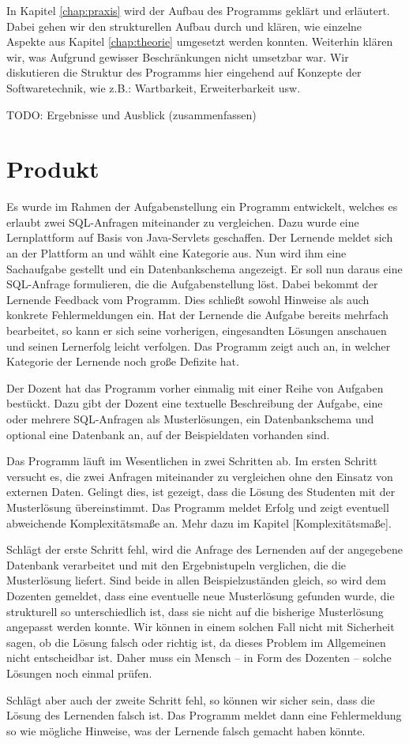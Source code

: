 In Kapitel \ref{chap:praxis} wird der Aufbau des Programms geklärt und erläutert. Dabei gehen wir den strukturellen Aufbau durch und klären, wie einzelne Aspekte aus Kapitel \ref{chap:theorie} umgesetzt werden konnten. Weiterhin klären wir, was Aufgrund gewisser Beschränkungen nicht umsetzbar war. Wir diskutieren die Struktur des Programms hier eingehend auf Konzepte der Softwaretechnik, wie z.B.: Wartbarkeit, Erweiterbarkeit usw.

TODO: Ergebnisse und Ausblick (zusammenfassen)


\section{Produkt}

Es wurde im Rahmen der Aufgabenstellung ein Programm entwickelt, welches es erlaubt zwei SQL-Anfragen miteinander zu vergleichen. Dazu wurde eine Lernplattform auf Basis von Java-Servlets geschaffen. Der Lernende meldet sich an der Plattform an und wählt eine Kategorie aus. Nun wird ihm eine Sachaufgabe gestellt und ein Datenbankschema angezeigt. Er soll nun daraus eine SQL-Anfrage formulieren, die die Aufgabenstellung löst. Dabei bekommt der Lernende Feedback vom Programm. Dies schließt sowohl Hinweise als auch konkrete Fehlermeldungen ein. Hat der Lernende die Aufgabe bereits mehrfach bearbeitet, so kann er sich seine vorherigen, eingesandten Lösungen anschauen und seinen Lernerfolg leicht verfolgen. Das Programm zeigt auch an, in welcher Kategorie der Lernende noch große Defizite hat.

Der Dozent hat das Programm vorher einmalig mit einer Reihe von Aufgaben bestückt. Dazu gibt der Dozent eine textuelle Beschreibung der Aufgabe, eine oder mehrere SQL-Anfragen als Musterlösungen, ein Datenbankschema und optional eine Datenbank an, auf der Beispieldaten vorhanden sind. 

Das Programm läuft im Wesentlichen in zwei Schritten ab. Im ersten Schritt versucht es, die zwei Anfragen miteinander zu vergleichen ohne den Einsatz von externen Daten. Gelingt dies, ist gezeigt, dass die Lösung des Studenten mit der Musterlösung übereinstimmt. Das Programm meldet Erfolg und zeigt eventuell abweichende Komplexitätsmaße an. Mehr dazu im Kapitel [Komplexitätsmaße].

Schlägt der erste Schritt fehl, wird die Anfrage des Lernenden auf der angegebene Datenbank verarbeitet und mit den Ergebnistupeln verglichen, die die Musterlösung liefert. Sind beide in allen Beispielzuständen gleich, so wird dem Dozenten gemeldet, dass eine eventuelle neue Musterlösung gefunden wurde, die strukturell so unterschiedlich ist, dass sie nicht auf die bisherige Musterlösung angepasst werden konnte. Wir können in einem solchen Fall nicht mit Sicherheit sagen, ob die Lösung falsch oder richtig ist, da dieses Problem im Allgemeinen nicht entscheidbar ist. Daher muss ein Mensch -- in Form des Dozenten -- solche Lösungen noch einmal prüfen.

Schlägt aber auch der zweite Schritt fehl, so können wir sicher sein, dass die Lösung des Lernenden falsch ist. Das Programm meldet dann eine Fehlermeldung so wie mögliche Hinweise, was der Lernende falsch gemacht haben könnte.


